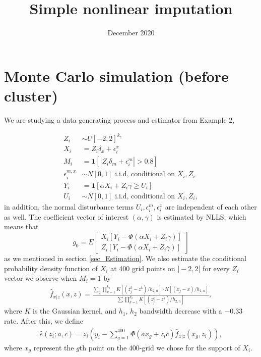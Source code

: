 \documentclass{article}
\title{Simple nonlinear imputation}
\author{}
\date{December 2020}
\theoremstyle{definition}
\theoremstyle{remark}
\begin{document}
\maketitle

\onehalfspacing


\section{Monte Carlo simulation (before cluster)}

We are studying a data generating process and estimator from Example 2,

\begin{align}
Z_i &\sim U[-2, 2]^{k_z}\\
X_i &= Z_i\delta_x + \epsilon^x_i \\
M_i &= \mathbf{1}[|Z_i \delta_m + \epsilon^m_{i}|>0.8] \\
\epsilon^{m,x}_{i} &\sim N[0,1] \text{  i.i.d, conditional on $X_i, Z_i$} \\
Y_i &= \mathbf{1}[\alpha X_i + Z_i \gamma \geq U_{i}] \\
U_{i} &\sim N[0,1] \text{  i.i.d, conditional on $X_i, Z_i$},
\end{align}
in addition, the normal disturbance terms $U_i, \epsilon_i^m, \epsilon_i^x$ are independent of each other as well. The coefficient vector of interest $(\alpha, \gamma)$ is estimated by NLLS, which means that
\[g_0 = E\left[\begin{array}{c}X_i[Y_i - \Phi(\alpha X_i + Z_i \gamma)] \\
							   Z_i[Y_i - \Phi(\alpha X_i + Z_i \gamma)]
				\end{array}\right]
\] 
as we mentioned in section \ref{sec_Estimation}. We also estimate the conditional probability density function of $X_i$ at 400 grid points on $]-2,2[$ for every $Z_i$ vector we observe when $M_i=1$ by
\begin{align}
\hat{f}_{x|z}(x,z) = \frac{\sum_j \prod_{k=1}^{k_z} K[(z^k_j-z^k)/h_{2,n}] \cdot K[(x_j - x)/h_{1,n}]}{\sum \prod_{k=1}^{k_z} K[(z^k_j-z^k)/h_{2,n}]},
\end{align}
where $K$ is the Gaussian kernel, and $h_1$, $h_2$ bandwidth decrease with a $-0.33$ rate. After this, we define
\begin{align}
\hat{e}(z_i; a, c) = z_i \left(y_i-\sum_{g=1}^{400}\Phi\left(a x_g + z_i c\right)\hat{f}_{x|z}(x_g,z_i)\right), 
\end{align}
where $x_g$ represent the $g$th point on the 400-grid we chose for the support of $X_i$.
\end{document}
